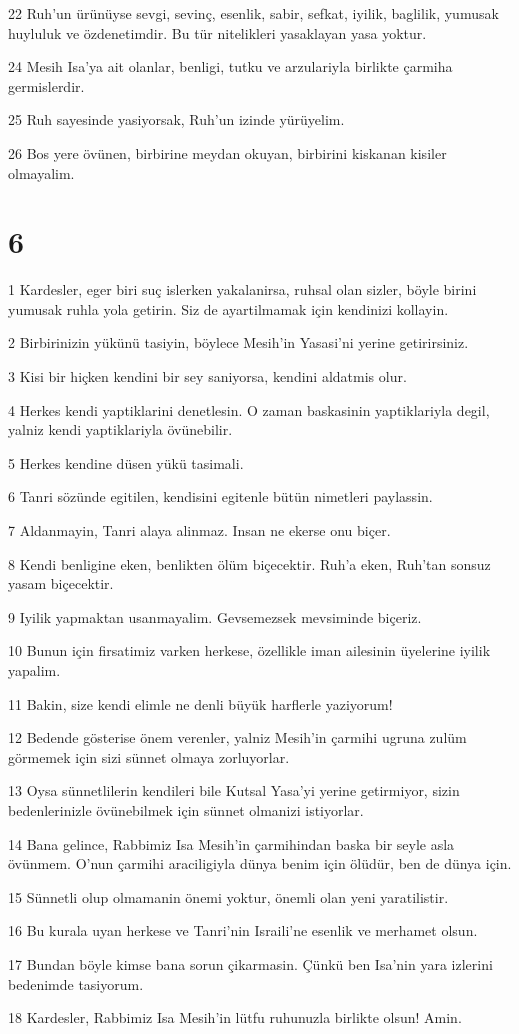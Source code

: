 \par 22 Ruh'un ürünüyse sevgi, sevinç, esenlik, sabir, sefkat, iyilik, baglilik, yumusak huyluluk ve özdenetimdir. Bu tür nitelikleri yasaklayan yasa yoktur.
\par 24 Mesih Isa'ya ait olanlar, benligi, tutku ve arzulariyla birlikte çarmiha germislerdir.
\par 25 Ruh sayesinde yasiyorsak, Ruh'un izinde yürüyelim.
\par 26 Bos yere övünen, birbirine meydan okuyan, birbirini kiskanan kisiler olmayalim.

\chapter{6}

\par 1 Kardesler, eger biri suç islerken yakalanirsa, ruhsal olan sizler, böyle birini yumusak ruhla yola getirin. Siz de ayartilmamak için kendinizi kollayin.
\par 2 Birbirinizin yükünü tasiyin, böylece Mesih'in Yasasi'ni yerine getirirsiniz.
\par 3 Kisi bir hiçken kendini bir sey saniyorsa, kendini aldatmis olur.
\par 4 Herkes kendi yaptiklarini denetlesin. O zaman baskasinin yaptiklariyla degil, yalniz kendi yaptiklariyla övünebilir.
\par 5 Herkes kendine düsen yükü tasimali.
\par 6 Tanri sözünde egitilen, kendisini egitenle bütün nimetleri paylassin.
\par 7 Aldanmayin, Tanri alaya alinmaz. Insan ne ekerse onu biçer.
\par 8 Kendi benligine eken, benlikten ölüm biçecektir. Ruh'a eken, Ruh'tan sonsuz yasam biçecektir.
\par 9 Iyilik yapmaktan usanmayalim. Gevsemezsek mevsiminde biçeriz.
\par 10 Bunun için firsatimiz varken herkese, özellikle iman ailesinin üyelerine iyilik yapalim.
\par 11 Bakin, size kendi elimle ne denli büyük harflerle yaziyorum!
\par 12 Bedende gösterise önem verenler, yalniz Mesih'in çarmihi ugruna zulüm görmemek için sizi sünnet olmaya zorluyorlar.
\par 13 Oysa sünnetlilerin kendileri bile Kutsal Yasa'yi yerine getirmiyor, sizin bedenlerinizle övünebilmek için sünnet olmanizi istiyorlar.
\par 14 Bana gelince, Rabbimiz Isa Mesih'in çarmihindan baska bir seyle asla övünmem. O'nun çarmihi araciligiyla dünya benim için ölüdür, ben de dünya için.
\par 15 Sünnetli olup olmamanin önemi yoktur, önemli olan yeni yaratilistir.
\par 16 Bu kurala uyan herkese ve Tanri'nin Israili'ne esenlik ve merhamet olsun.
\par 17 Bundan böyle kimse bana sorun çikarmasin. Çünkü ben Isa'nin yara izlerini bedenimde tasiyorum.
\par 18 Kardesler, Rabbimiz Isa Mesih'in lütfu ruhunuzla birlikte olsun! Amin.


